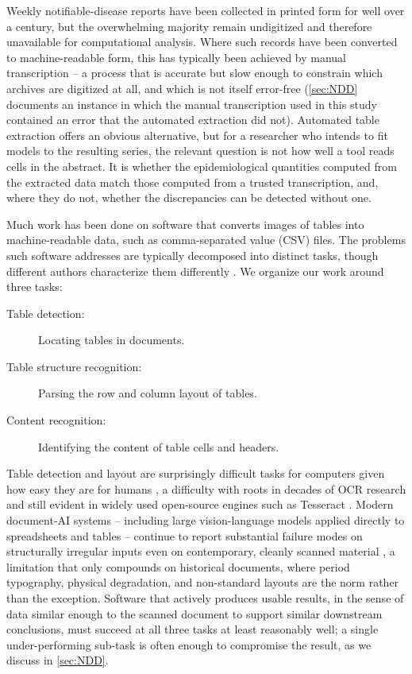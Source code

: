 \documentclass[12pt]{article}
\begin{document}
Weekly notifiable-disease reports have been collected in printed form for well over a century, but the overwhelming majority remain undigitized and therefore unavailable for computational analysis. Where such records have been converted to machine-readable form, this has typically been achieved by manual transcription -- a process that is accurate but slow enough to constrain which archives are digitized at all, and which is not itself error-free (\cref{sec:NDD} documents an instance in which the manual transcription used in this study contained an error that the automated extraction did not). Automated table extraction offers an obvious alternative, but for a researcher who intends to fit models to the resulting series, the relevant question is not how well a tool reads cells in the abstract. It is whether the epidemiological quantities computed from the extracted data match those computed from a trusted transcription, and, where they do not, whether the discrepancies can be detected without one.

Much work has been done on software that converts images of tables into machine-readable data, such as comma-separated value (CSV) files. The problems such software addresses are typically decomposed into distinct tasks, though different authors characterize them differently \cite{zhong2020image}. We organize our work around three tasks:
\begin{description}
    \item[Table detection:] Locating tables in documents.
    \item[Table structure recognition:] Parsing the row and column layout of tables.
    \item[Content recognition:] Identifying the content of table cells and headers.
\end{description}
Table detection and layout are surprisingly difficult tasks for computers given how easy they are for humans \cite{hu2002evaluating}, a difficulty with roots in decades of OCR research \cite{Mori1992} and still evident in widely used open-source engines such as Tesseract \cite{TessOverview}. Modern document-AI systems -- including large vision-language models applied directly to spreadsheets and tables -- continue to report substantial failure modes on structurally irregular inputs even on contemporary, cleanly scanned material \cite{xia2024vision,Sahasrabudhe2025}, a limitation that only compounds on historical documents, where period typography, physical degradation, and non-standard layouts are the norm rather than the exception. Software that actively produces usable results, in the sense of data similar enough to the scanned document to support similar downstream conclusions, must succeed at all three tasks at least reasonably well; a single under-performing sub-task is often enough to compromise the result, as we discuss in \cref{sec:NDD}.
\end{document}
